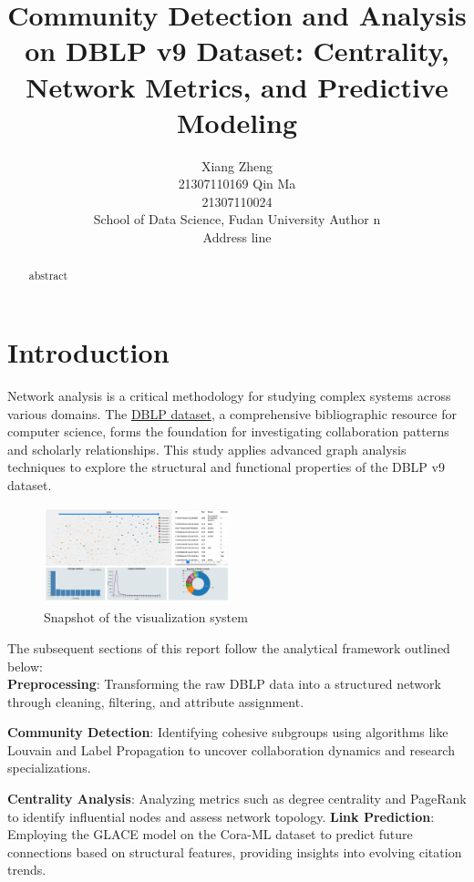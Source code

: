 \documentclass[11pt]{article}
\title{Community Detection and Analysis on DBLP v9 Dataset: Centrality, Network Metrics, and Predictive Modeling}
\author{
  Xiang Zheng \\ 21307110169 \And  
  Qin Ma      \\ 21307110024 
  \vspace{0.2cm} \\ %
  \hfill School of Data Science, Fudan University \hfill
  \And
  Author n \\ Address line
}
\begin{document}
\maketitle
\begin{abstract}
	abstract
\end{abstract}

\section{Introduction}

Network analysis is a critical methodology for studying complex systems across various domains. The \href{https://www.aminer.cn/citation}{DBLP dataset}, a comprehensive bibliographic resource for computer science, forms the foundation for investigating collaboration patterns and scholarly relationships. This study applies advanced graph analysis techniques to explore the structural and functional properties of the DBLP v9 dataset.

\begin{figure}[ht]
	\centering
	\includegraphics[width=0.48\textwidth]{img/introduction/visualization.png}
	\caption{Snapshot of the visualization system}
	\label{fig:visualize}
\end{figure}

The subsequent sections of this report follow the analytical framework outlined below:
\\

\textbf{Preprocessing}: Transforming the raw DBLP data into a structured network through cleaning, filtering, and attribute assignment.

\textbf{Community Detection}: Identifying cohesive subgroups using algorithms like Louvain and Label Propagation to uncover collaboration dynamics and research specializations.

\textbf{Centrality Analysis}: Analyzing metrics such as degree centrality and PageRank to identify influential nodes and assess network topology.
\textbf{Link Prediction}: Employing the GLACE model on the Cora-ML dataset to predict future connections based on structural features, providing insights into evolving citation trends.
\end{document}
